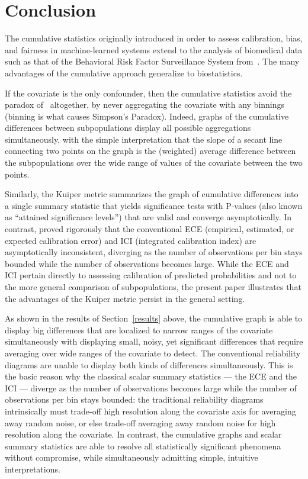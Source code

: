 \documentclass[]{fairmeta}
\begin{document}
\section{Conclusion}
\label{conclusion}

The cumulative statistics originally introduced in order to assess
calibration, bias, and fairness in machine-learned systems extend
to the analysis of biomedical data such as that
of the Behavioral Risk Factor Surveillance System from~\cite{brfss}.
The many advantages of the cumulative approach generalize to biostatistics.

If the covariate is the only confounder, then the cumulative statistics
avoid the paradox of~\cite{simpson} altogether,
by never aggregating the covariate with any binnings
(binning is what causes Simpson's Paradox).
Indeed, graphs of the cumulative differences between subpopulations
display all possible aggregations simultaneously,
with the simple interpretation that the slope of a secant line connecting
two points on the graph is the (weighted) average difference
between the subpopulations over the wide range of values of the covariate
between the two points.

Similarly, the Kuiper metric summarizes the graph of cumulative differences
into a single summary statistic that yields significance tests
with P-values (also known as ``attained significance levels'')
that are valid and converge asymptotically.
In contrast, \cite{arrieta-ibarra-gujral-tannen-tygert-xu}
proved rigorously that the conventional ECE (empirical, estimated, or expected
calibration error) and ICI (integrated calibration index)
are asymptotically inconsistent, diverging as the number of observations
per bin stays bounded while the number of observations becomes large.
While the ECE and ICI pertain directly to assessing calibration
of predicted probabilities and not to the more general comparison
of subpopulations, the present paper illustrates that the advantages
of the Kuiper metric persist in the general setting.

As shown in the results of Section~\ref{results} above,
the cumulative graph is able to display big differences
that are localized to narrow ranges of the covariate
simultaneously with displaying small, noisy, yet significant differences
that require averaging over wide ranges of the covariate to detect.
The conventional reliability diagrams are unable to display
both kinds of differences simultaneously.
This is the basic reason why the classical scalar summary statistics
--- the ECE and the ICI --- diverge as the number of observations becomes large
while the number of observations per bin stays bounded:
the traditional reliability diagrams intrinsically must trade-off
high resolution along the covariate axis for averaging away random noise,
or else trade-off averaging away random noise for high resolution
along the covariate. In contrast, the cumulative graphs
and scalar summary statistics are able to resolve
all statistically significant phenomena without compromise,
while simultaneously admitting simple, intuitive interpretations.
\end{document}
